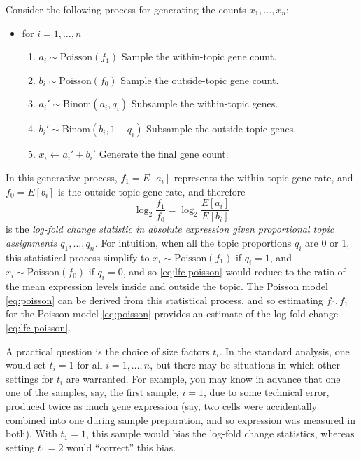 \documentclass[final]{siamart171218}
\begin{document}
Consider the following process for generating the counts $x_1, \ldots,
x_n$:
\begin{itemize}

\item for $i = 1, \ldots, n$
\begin{enumerate}

\item $a_i \sim \mathrm{Poisson}(f_1)$ 
\hfill Sample the within-topic gene count. \hspace{2em}

\item $b_i \sim \mathrm{Poisson}(f_0)$ 
\hfill Sample the outside-topic gene count. \hspace{2em}

\item $a_i' \sim \mathrm{Binom}(a_i, q_i)$ 
\hfill Subsample the within-topic genes. \hspace{2em}

\item $b_i' \sim \mathrm{Binom}(b_i, 1-q_i)$ 
\hfill Subsample the outside-topic genes. \hspace{2em}

\item $x_i \leftarrow a_i' + b_i'$ 
\hfill Generate the final gene count. \hspace{2em}

\end{enumerate}
\end{itemize}
In this generative process, $f_1 = E[a_i]$ represents the
within-topic gene rate, and $f_0 = E[b_i]$ is the outside-topic gene
rate, and therefore 
\begin{equation}
\log_2 \frac{f_1}{f_0} = \log_2 \frac{E[a_i]}{E[b_i]}
\label{eq:lfc-poisson}
\end{equation}
is the {\em log-fold change statistic in absolute expression given
  proportional topic assignments $q_1, \ldots, q_n$.} For intuition,
when all the topic proportions $q_i$ are 0 or 1, this statistical
process simplify to $x_i \sim \mathrm{Poisson}(f_1)$ if $q_i = 1$, and
$x_i \sim \mathrm{Poisson}(f_0)$ if $q_i = 0$, and so
\eqref{eq:lfc-poisson} would reduce to the ratio of the mean
expression levels inside and outside the topic. The Poisson model
\eqref{eq:poisson} can be derived from this statistical process, and
so estimating $f_0, f_1$ for the Poisson model \eqref{eq:poisson}
provides an estimate of the log-fold change \eqref{eq:lfc-poisson}.

A practical question is the choice of size factors $t_i$. In the
standard analysis, one would set $t_i = 1$ for all $i = 1, \ldots, n$,
but there may be situations in which other settings for $t_i$ are
warranted. For example, you may know in advance that one one of the
samples, say, the first sample, $i = 1$, due to some technical error,
produced twice as much gene expression (say, two cells were
accidentally combined into one during sample preparation, and so
expression was measured in both). With $t_1 = 1$, this sample would
bias the log-fold change statistics, whereas setting $t_1 = 2$ would
``correct'' this bias.
\end{document}
